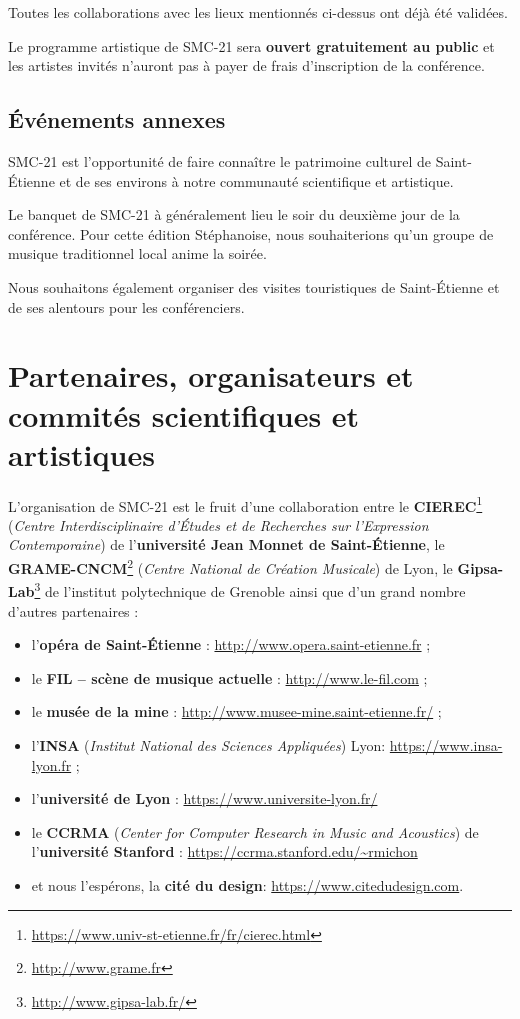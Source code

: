 \documentclass[fontsize=12pt]{scrartcl} %
\numberwithin{equation}{section} %
\numberwithin{figure}{section} %
\numberwithin{table}{section} %
\begin{document}
Toutes les collaborations avec les lieux mentionnés ci-dessus ont déjà été validées.

Le programme artistique de SMC-21 sera \textbf{ouvert gratuitement au public} et les artistes invités n'auront pas à payer de frais d'inscription de la conférence.

\subsection{Événements annexes}

SMC-21 est l'opportunité de faire connaître le patrimoine culturel de Saint-Étienne et de ses environs à notre communauté scientifique et artistique. 

Le banquet de SMC-21 à généralement lieu le soir du deuxième jour de la conférence. Pour cette édition Stéphanoise, nous souhaiterions qu'un groupe de musique traditionnel local anime la soirée.

Nous souhaitons également organiser des visites touristiques de Saint-Étienne et de ses alentours pour les conférenciers.

\section{Partenaires, organisateurs et commités scientifiques et artistiques}

L'organisation de SMC-21 est le fruit d'une collaboration entre le \textbf{CIEREC}\footnote{\url{https://www.univ-st-etienne.fr/fr/cierec.html}} (\textit{Centre Interdisciplinaire d'Études et de Recherches sur l'Expression Contemporaine}) de l'\textbf{université Jean Monnet de Saint-Étienne}, le \textbf{GRAME-CNCM}\footnote{\url{http://www.grame.fr}} (\textit{Centre National de Création Musicale}) de Lyon, le \textbf{Gipsa-Lab}\footnote{\url{http://www.gipsa-lab.fr/}} de l'institut polytechnique de Grenoble ainsi que d'un grand nombre d'autres partenaires :

\begin{itemize}
\item l'\textbf{opéra de Saint-Étienne} : \url{http://www.opera.saint-etienne.fr} ;
\item le \textbf{FIL -- scène de musique actuelle} : \url{http://www.le-fil.com} ;
\item le \textbf{musée de la mine} : \url{http://www.musee-mine.saint-etienne.fr/} ;
\item l'\textbf{INSA} (\textit{Institut National des Sciences Appliquées}) Lyon: \url{https://www.insa-lyon.fr} ;
\item l'\textbf{université de Lyon} : \url{https://www.universite-lyon.fr/}
\item le \textbf{CCRMA} (\textit{Center for Computer Research in Music and Acoustics}) de l'\textbf{université Stanford} : \url{https://ccrma.stanford.edu/~rmichon}
\item et nous l'espérons, la \textbf{cité du design}: \url{https://www.citedudesign.com}.
\end{itemize}
\end{document}
